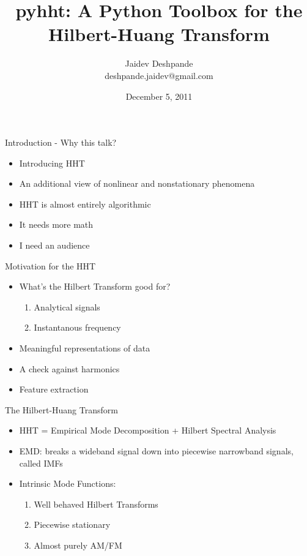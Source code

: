 \documentclass[xcolor=dvipsnames]{beamer}
\title{pyhht: A Python Toolbox for the Hilbert-Huang Transform}
\author{Jaidev Deshpande \\ deshpande.jaidev@gmail.com}
\institute{VIIT, Pune}
\date{December 5, 2011}
\begin{document}
	

\begin{frame}
\titlepage
\end{frame}



\begin{frame}{Introduction - Why this talk?}
\begin{itemize}
\item Introducing HHT
\item An additional view of nonlinear and nonstationary phenomena
\item HHT is almost entirely algorithmic
\item It needs more math
\item I need an audience
\end{itemize}
\end{frame}

\begin{frame}{Motivation for the HHT}
\begin{itemize}
\item What's the Hilbert Transform good for?
\begin{enumerate}
\item Analytical signals
\item Instantanous frequency
\end{enumerate}
\item Meaningful representations of data
\item A check against harmonics
\item Feature extraction
\end{itemize}
\end{frame}

\begin{frame}{The Hilbert-Huang Transform}
\begin{itemize}
\item HHT = Empirical Mode Decomposition + Hilbert Spectral Analysis
\item EMD: breaks a wideband signal down into piecewise narrowband signals, called IMFs
\item Intrinsic Mode Functions:
\begin{enumerate}
\item Well behaved Hilbert Transforms
\item Piecewise stationary
\item Almost purely AM/FM
\end{enumerate}
\end{itemize}
\end{frame}
\end{document}
